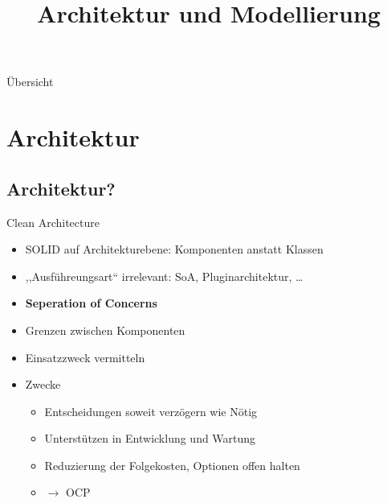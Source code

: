 \documentclass[10pt]{beamer}
\title{Architektur und Modellierung}
\author{}
\date{}
\begin{document}
\begin{frame}[plain]
    \maketitle
\end{frame}

\begin{frame}{Übersicht}
	\tableofcontents
\end{frame}

\section{Architektur}
\subsection{Architektur?}
\begin{frame}{Clean Architecture}
	\begin{itemize}
		\item SOLID auf Architekturebene: Komponenten anstatt Klassen
		\item ,,Ausführeungsart`` irrelevant: SoA, Pluginarchitektur, \ldots
		\item \textbf{Seperation of Concerns}
		\item Grenzen zwischen Komponenten
		\item Einsatzzweck vermitteln
		\item<2-> Zwecke
		\begin{itemize}
			\item Entscheidungen soweit verzögern wie Nötig
			\item Unterstützen in Entwicklung und Wartung
			\item Reduzierung der Folgekosten, Optionen offen halten
			\item $\rightarrow$ OCP
		\end{itemize}
	\end{itemize}
\end{frame}
\end{document}
